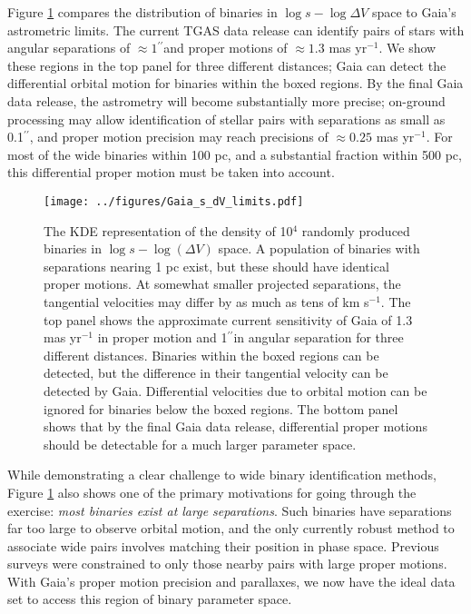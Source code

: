 \documentclass[usenatbib]{mnras}
\newcommand{\asec}{\ifmmode {^{\prime\prime}}\else$^{\prime\prime}$\fi}
\begin{document}
Figure \ref{fig:gaia_binary_limits} compares the distribution of binaries in $\log s-\log \Delta V$ space to Gaia's astrometric limits. The current TGAS data release can identify pairs of stars with angular separations of $\approx1$\asec and proper motions of $\approx 1.3 $ mas yr$^{-1}$. We show these regions in the top panel for three different distances; Gaia can detect the differential orbital motion for binaries within the boxed regions. By the final Gaia data release, the astrometry will become substantially more precise; on-ground processing may allow identification of stellar pairs with separations as small as 0.1\asec \citep{harrison11}, and proper motion precision may reach precisions of $\approx0.25$ mas yr$^{-1}$. For most of the wide binaries within 100 pc, and a substantial fraction within 500 pc, this differential proper motion must be taken into account.


\begin{figure}
\begin{center}
\texttt{[image: ../figures/Gaia\_s\_dV\_limits.pdf]}
\caption{ The KDE representation of the density of 10$^4$ randomly produced binaries in $\log s- \log(\Delta V)$ space. A population of binaries with separations nearing 1 pc exist, but these should have identical proper motions. At somewhat smaller projected separations, the tangential velocities may differ by as much as tens of km s$^{-1}$. The top panel shows the approximate current sensitivity of Gaia of 1.3 mas yr$^{-1}$ in proper motion and 1\asec in angular separation for three different distances. Binaries within the boxed regions can be detected, but the difference in their tangential velocity can be detected by Gaia. Differential velocities due to orbital motion can be ignored for binaries below the boxed regions. The bottom panel shows that by the final Gaia data release, differential proper motions should be detectable for a much larger parameter space. }
\label{fig:gaia_binary_limits}
\end{center}
\end{figure}

While demonstrating a clear challenge to wide binary identification methods, Figure \ref{fig:gaia_binary_limits} also shows one of the primary motivations for going through the exercise: {\it most binaries exist at large separations}. Such binaries have separations far too large to observe orbital motion, and the only currently robust method to associate wide pairs involves matching their position in phase space. Previous surveys were constrained to only those nearby pairs with large proper motions. With Gaia's proper motion precision and parallaxes, we now have the ideal data set to access this region of binary parameter space. 
\end{document}
